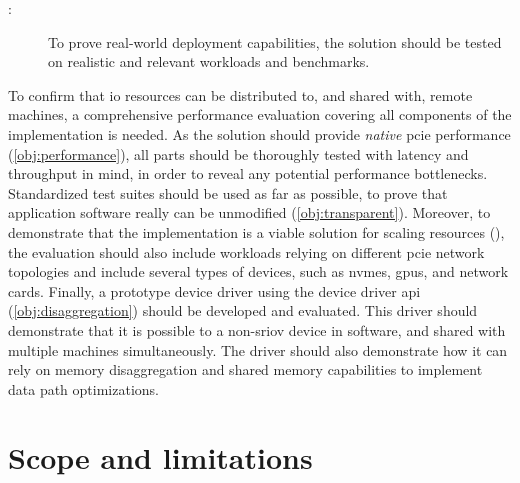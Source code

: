 \begin{description}    
    \item[:] To prove real-world deployment capabilities, the solution should be tested on realistic and relevant workloads and benchmarks.
\end{description}
To confirm that \gls{io} resources can be distributed to, and shared with, remote machines, a comprehensive performance evaluation covering all components of the implementation is needed.
As the solution should provide \emph{native} \gls{pcie} performance (\cref{obj:performance}), all parts should be thoroughly tested with latency and throughput in mind, in order to reveal any potential performance bottlenecks.
Standardized test suites should be used as far as possible, to prove that application software really can be unmodified (\cref{obj:transparent}).
%
Moreover, to demonstrate that the implementation is a viable solution for scaling resources (), the evaluation should also include workloads relying on different \gls{pcie} network topologies and include several types of devices, such as \glspl{nvme}, \glspl{gpu}, and network cards.
%
Finally, a prototype device driver using the device driver \gls{api} (\cref{obj:disaggregation}) should be developed and evaluated. This driver should demonstrate that it is possible to  a non-\gls{sriov} device in software, and shared with multiple machines simultaneously. The driver should also demonstrate how it can rely on memory \gls{disaggregation} and shared memory capabilities to implement data path optimizations.


\section{Scope and limitations}




